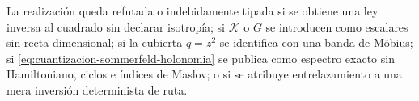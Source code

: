\begin{criterion}
\label{crit:limite-kepler-sommerfeld}
La realización queda refutada o indebidamente tipada si se obtiene una ley
inversa al cuadrado sin declarar isotropía; si
\(\mathcal K\) o \(G\) se introducen como escalares sin recta dimensional;
si la cubierta \(q=z^2\) se identifica con una banda de Möbius; si
\eqref{eq:cuantizacion-sommerfeld-holonomia} se publica como espectro exacto
sin Hamiltoniano, ciclos e índices de Maslov; o si se atribuye
entrelazamiento a una mera inversión determinista de ruta.
\end{criterion}
